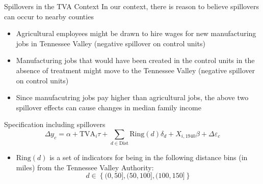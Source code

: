 \documentclass[aspectratio=169]{beamer}
\begin{document}
\begin{frame}{Spillovers in the TVA Context}
    In our context, there is reason to believe spillovers can occur to nearby counties

    \begin{itemize}
        \item Agricultural employees might be drawn to hire wages for new manufacturing jobs in Tennessee Valley (negative spillover on control units)
        
        \item Manufacturing jobs that would have been created in the control units in the absence of treatment might move to the Tennessee Valley (negative spillover on control units)
        
        \item Since manufacutring jobs pay higher than agricultural jobs, the above two spillover effects can cause changes in median family income
    \end{itemize}
\end{frame}

\begin{frame}{Specification including spillovers}
    \begin{equation}
        \Delta y_c = \alpha + \text{TVA}_i \tau + \sum_{d \in \text{Dist}} \text{Ring}(d)\delta_d + X_{i, 1940} \beta + \Delta \varepsilon_c
    \end{equation} 

    \begin{itemize}
        \item $\text{Ring}(d)$ is a set of indicators for being in the following distance bins (in miles) from the Tennessee Valley Authority: 
        \[ d \in \left\{ (0, 50], (50, 100], (100, 150] \right\} \]
    \end{itemize}
\end{frame}

\end{document}
